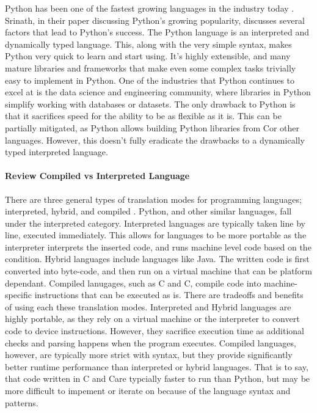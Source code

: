 \documentclass[12pt]{article}
\newcommand{\CC}{C\nolinebreak\hspace{-.05em}\raisebox{.4ex}{\tiny\bf +}\nolinebreak\hspace{-.10em}\raisebox{.4ex}{\tiny\bf + }}
\begin{document}
Python has been one of the fastest growing languages in the industry today \cite{article_python_growing_language}.
Srinath, in their paper discussing Python's growing popularity, discusses several factors that lead to Python's success.
The Python language is an interpreted and dynamically typed language.
This, along with the very simple syntax, makes Python very quick to learn and start using.
It's highly extensible, and many mature libraries and frameworks that make even some complex tasks trivially easy to implement in Python.
One of the industries that Python continues to excel at is the data science and engineering community, where libraries in Python simplify working with databases or datasets.
The only drawback to Python is that it sacrifices speed for the ability to be as flexible as it is.
This can be partially mitigated, as Python allows building Python libraries from \CC  or other languages.
However, this doesn't fully eradicate the drawbacks to a dynamically typed interpreted language.

\paragraph{Review Compiled vs Interpreted Language}

There are three general types of translation modes for programming languages; interpreted, hybrid, and compiled \cite{article_compiled_interpreted_hybrid_languages}.
Python, and other similar languages, fall under the interpreted category.
Interpreted languages are typically taken line by line, executed immediately.
This allows for languages to be more portable as the interpreter interprets the inserted code, and runs machine level code based on the condition.
Hybrid languages include languages like Java.
The written code is first converted into byte-code, and then run on a virtual machine that can be platform dependant.
Compiled lanugages, such as C and \CC, compile code into machine-specific instructions that can be executed as is.
There are tradeoffs and benefits of using each these translation modes.
Interpreted and Hybrid languages are highly portable, as they rely on a virtual machine or the interpreter to convert code to device instructions.
However, they sacrifice execution time as additional checks and parsing happens when the program executes.
Compiled languages, however, are typically more strict with syntax, but they provide significantly better runtime performance than interpreted or hybrid languages.
That is to say, that code written in C and \CC are typcially faster to run than Python, but may be more difficult to impement or iterate on because of the language syntax and patterns.
\end{document}
